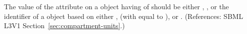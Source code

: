 The value of the  attribute on a \Compartment object having
 of  should be either ,
, or the identifier of a \UnitDefinition object based on either
,  (with  equal to ), or
.  (References: SBML L3V1
Section~\ref{sec:compartment-units}.)
